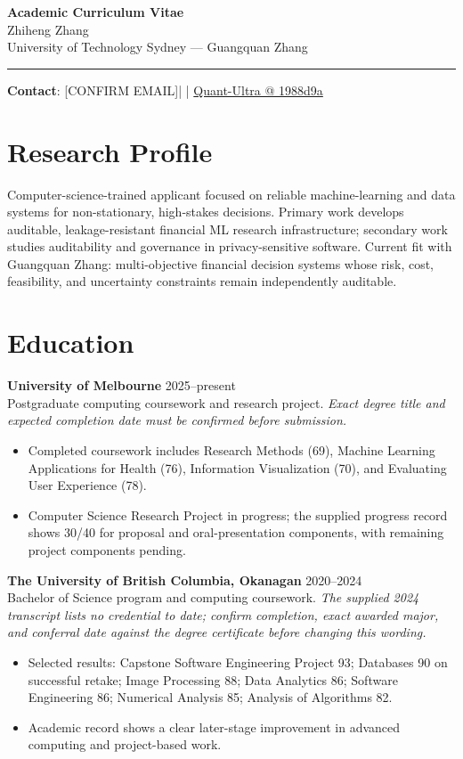 \documentclass[11pt]{article}
\makeatletter
\newcommand{\ApplicantName}{Zhiheng Zhang}
\newcommand{\ApplicantEmail}{[CONFIRM EMAIL]}
\newcommand{\ApplicantPhone}{[CONFIRM PHONE]}
\newcommand{\ApplicantGitHub}{\href{https://github.com/zhiheng-zhang-Mera/Quant-Ultra/tree/1988d9a8530da91a8158de864d098ea869098923}{Quant-Ultra @ 1988d9a}}
\makeatother
\begin{document}
\begin{center}
{\LARGE\bfseries Academic Curriculum Vitae}\\[0.25em]
{\large \ApplicantName}\\
University of Technology Sydney --- Guangquan Zhang
\end{center}
\vspace{0.35em}\hrule\vspace{0.65em}

\textbf{Contact}: \ApplicantEmail\quad | \quad \ApplicantPhone\quad | \quad \ApplicantGitHub

\section*{Research Profile}
Computer-science-trained applicant focused on reliable machine-learning and data systems for non-stationary, high-stakes decisions. Primary work develops auditable, leakage-resistant financial ML research infrastructure; secondary work studies auditability and governance in privacy-sensitive software. Current fit with Guangquan Zhang: multi-objective financial decision systems whose risk, cost, feasibility, and uncertainty constraints remain independently auditable.

\section*{Education}
\textbf{University of Melbourne} \hfill 2025--present\\
Postgraduate computing coursework and research project. \textit{Exact degree title and expected completion date must be confirmed before submission.}
\begin{itemize}
\item Completed coursework includes Research Methods (69), Machine Learning Applications for Health (76), Information Visualization (70), and Evaluating User Experience (78).
\item Computer Science Research Project in progress; the supplied progress record shows 30/40 for proposal and oral-presentation components, with remaining project components pending.
\end{itemize}

\textbf{The University of British Columbia, Okanagan} \hfill 2020--2024\\
Bachelor of Science program and computing coursework. \textit{The supplied 2024 transcript lists no credential to date; confirm completion, exact awarded major, and conferral date against the degree certificate before changing this wording.}
\begin{itemize}
\item Selected results: Capstone Software Engineering Project 93; Databases 90 on successful retake; Image Processing 88; Data Analytics 86; Software Engineering 86; Numerical Analysis 85; Analysis of Algorithms 82.
\item Academic record shows a clear later-stage improvement in advanced computing and project-based work.
\end{itemize}
\end{document}
